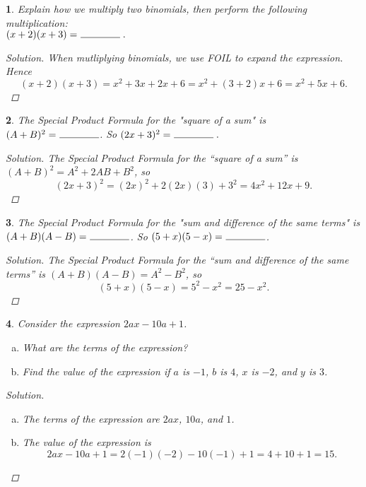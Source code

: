 \documentclass[12pt]{amsart}
\newtheorem{thm}{}
\begin{document}
\setcounter{thm}{3}
\begin{thm}
  Explain how we multiply two binomials, then perform the following multiplication:\\
  \indent $(x + 2)(x + 3) =\ \line(1,0){40}.$
  
  \begin{proof}[Solution]
    When mutliplying binomials, we use FOIL to expand the expression.
    Hence
    $$(x + 2)(x + 3) = x^2 + 3x + 2x + 6 = x^2 + (3 + 2)x + 6 = x^2 + 5x + 6.$$
  \end{proof}
\end{thm}

\begin{thm}
  The Special Product Formula for the "square of a sum" is\\
  \indent $(A + B)^2 =\ \line(1,0){40}$.  
  So $(2x + 3)^2 =\ \line(1,0){40}.$
  
  \begin{proof}[Solution]
    The Special Product Formula for the ``square of a sum'' is $(A + B)^2 = A^2 + 2AB + B^2$, so
    $$(2x + 3)^2 = (2x)^2 + 2(2x)(3) + 3^2 = 4x^2 + 12x + 9.$$
  \end{proof}
\end{thm}

\begin{thm}
  The Special Product Formula for the "sum and difference of the same terms" is\\
  \indent $(A + B)(A - B) =\ \line(1,0){40}$.
  So $(5 + x)(5 - x) =\ \line(1,0){40}$.
  \begin{proof}[Solution]
    The Special Product Formula for the ``sum and difference of the same terms'' is $(A+B)(A-B) = A^2 - B^2$, so 
    $$(5 + x)(5 - x) = 5^2 - x^2 = 25 - x^2.$$
  \end{proof}
\end{thm}

\setcounter{thm}{10}
\begin{thm}
  Consider the expression $2ax - 10a + 1$.
  \begin{enumerate}[(a)]
  \item
    What are the terms of the expression?
  \item
    Find the value of the expression if $a$ is $-1$, $b$ is $4$, $x$ is $-2$, and $y$ is $3$.
  \end{enumerate}
  
  \begin{proof}[Solution]
    \begin{enumerate}[(a)]
      \item
        The terms of the expression are $2ax$, $10a$, and $1$.
      \item
        The value of the expression is
        $$2ax - 10a + 1 = 2(-1)(-2) - 10(-1) + 1 = 4 + 10 + 1 = 15.$$
    \end{enumerate}
  \end{proof}
\end{thm}
\end{document}
